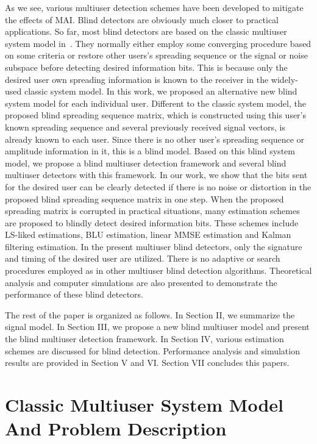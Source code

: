 \documentclass[a4paper,11pt,fleqn]{article}
\begin{document}
As we see, various multiuser detection schemes have been developed
to mitigate the effects of MAI. Blind detectors are obviously much
closer to practical applications. So far, most blind detectors are
based on the classic multiuser system model in~\cite{Verd98}. They
normally either employ some converging procedure based on some
criteria or restore other users's spreading sequence or the signal
or noise subspace before detecting desired information bits. This
is because only the desired user own spreading information is
known to the receiver in the widely-used classic system model. In
this work, we proposed an alternative new blind system model for
each individual user. Different to the classic system model, the
proposed blind spreading sequence matrix, which is constructed
using this user's known spreading sequence and several previously
received signal vectors, is already known to each user. Since
there is no other user's spreading sequence or amplitude
information in it, this is a blind model. Based on this blind
system model, we propose a blind multiuser detection framework and
several blind multiuser detectors with this framework. In our
work, we show that the bits sent for the desired user can be
clearly detected if there is no noise or distortion in the
proposed blind spreading sequence matrix in one step. When the
proposed spreading matrix is corrupted in practical situations,
many estimation schemes are proposed to blindly detect desired
information bits. These schemes include LS-liked estimations, BLU
estimation, linear MMSE estimation and Kalman filtering
estimation. In the present multiuser blind detectors, only the
signature and timing of the desired user are utilized. There is no
adaptive or search procedures employed as in other multiuser blind
detection algorithms. Theoretical analysis and computer
simulations are also presented to demonstrate the performance of
these blind detectors.

The rest of the paper is organized as follows. In Section II, we
summarize the signal model. In Section III, we propose a new blind
multiuser model and present the blind multiuser detection
framework. In Section IV, various estimation schemes are discussed
for blind detection. Performance analysis and simulation results
are provided in Section V and VI. Section VII concludes this
papers.


\section{Classic Multiuser System Model And Problem Description}
\end{document}

